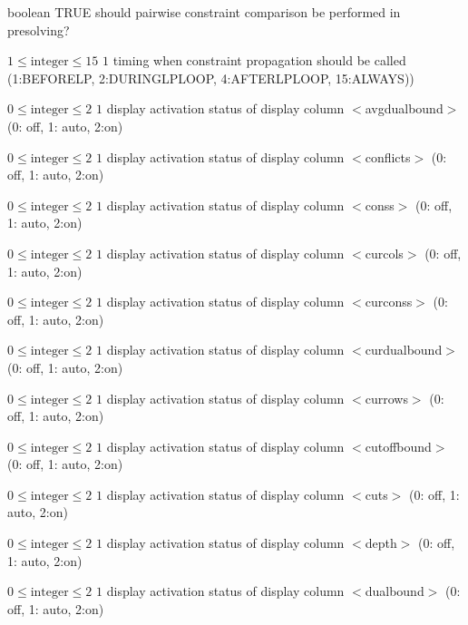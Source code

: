 %
{boolean}%
{TRUE}%
{should pairwise constraint comparison be performed in presolving?}%
{}

%
{$1\leq\textrm{integer}\leq15$}%
{$1$}%
{timing when constraint propagation should be called (1:BEFORELP, 2:DURINGLPLOOP, 4:AFTERLPLOOP, 15:ALWAYS))}%
{}

%
{$0\leq\textrm{integer}\leq2$}%
{$1$}%
{display activation status of display column $<$avgdualbound$>$ (0: off, 1: auto, 2:on)}%
{}

%
{$0\leq\textrm{integer}\leq2$}%
{$1$}%
{display activation status of display column $<$conflicts$>$ (0: off, 1: auto, 2:on)}%
{}

%
{$0\leq\textrm{integer}\leq2$}%
{$1$}%
{display activation status of display column $<$conss$>$ (0: off, 1: auto, 2:on)}%
{}

%
{$0\leq\textrm{integer}\leq2$}%
{$1$}%
{display activation status of display column $<$curcols$>$ (0: off, 1: auto, 2:on)}%
{}

%
{$0\leq\textrm{integer}\leq2$}%
{$1$}%
{display activation status of display column $<$curconss$>$ (0: off, 1: auto, 2:on)}%
{}

%
{$0\leq\textrm{integer}\leq2$}%
{$1$}%
{display activation status of display column $<$curdualbound$>$ (0: off, 1: auto, 2:on)}%
{}

%
{$0\leq\textrm{integer}\leq2$}%
{$1$}%
{display activation status of display column $<$currows$>$ (0: off, 1: auto, 2:on)}%
{}

%
{$0\leq\textrm{integer}\leq2$}%
{$1$}%
{display activation status of display column $<$cutoffbound$>$ (0: off, 1: auto, 2:on)}%
{}

%
{$0\leq\textrm{integer}\leq2$}%
{$1$}%
{display activation status of display column $<$cuts$>$ (0: off, 1: auto, 2:on)}%
{}

%
{$0\leq\textrm{integer}\leq2$}%
{$1$}%
{display activation status of display column $<$depth$>$ (0: off, 1: auto, 2:on)}%
{}

%
{$0\leq\textrm{integer}\leq2$}%
{$1$}%
{display activation status of display column $<$dualbound$>$ (0: off, 1: auto, 2:on)}%
{}

